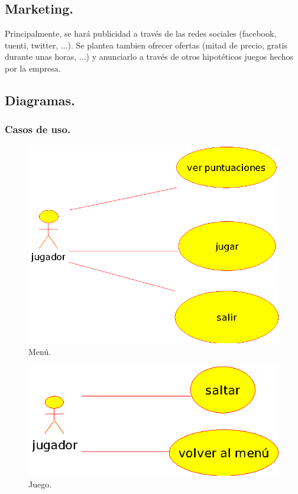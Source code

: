 \documentclass[12 pt, a4paper, twoside]{article}
\begin{document}
\subsection{Marketing.}
Principalmente, se hará publicidad a través de las redes sociales (facebook,
tuenti, twitter, ...). Se plantea tambien ofrecer ofertas (mitad de precio,
gratis durante unas horas, ...) y anunciarlo a través de otros hipotéticos
juegos hechos por la empresa.

\subsection{Diagramas.}
\subsubsection{Casos de uso.}
\begin{figure}[h]
\centering
\includegraphics[width = 10 cm]{casos_de_uso_(menu).eps}
\caption{Menú.}
\end{figure}

\begin{figure}[h]
\centering
\includegraphics[width = 10 cm]{casos_de_uso_(juego).eps}
\caption{Juego.}
\end{figure}

\clearpage


\end{document}
